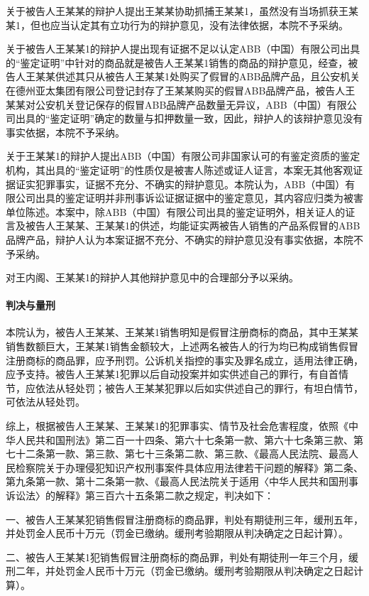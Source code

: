 \documentclass[
    a4paper
    ]{ctexart}
\begin{document}
{\begin{sloppy}
关于被告人王某某的辩护人提出王某某协助抓捕王某某1，虽然没有当场抓获王某某1，但也应当认定其有立功行为的辩护意见，没有法律依据，本院不予采纳。

关于被告人王某某1的辩护人提出现有证据不足以认定ABB（中国）有限公司出具的“鉴定证明”中针对的商品就是被告人王某某1销售的商品的辩护意见，经查，被告人王某某供述其只从被告人王某某1处购买了假冒的ABB品牌产品，且公安机关在德州亚太集团有限公司登记封存了王某某购买的假冒ABB品牌产品，被告人王某某对公安机关登记保存的假冒ABB品牌产品数量无异议，ABB（中国）有限公司出具的“鉴定证明”确定的数量与扣押数量一致，因此，辩护人的该辩护意见没有事实依据，本院不予采纳。

关于王某某1的辩护人提出ABB（中国）有限公司非国家认可的有鉴定资质的鉴定机构，其出具的“鉴定证明”的性质仅是被害人陈述或证人证言，本案无其他客观证据证实犯罪事实，证据不充分、不确实的辩护意见。本院认为，ABB（中国）有限公司出具的鉴定证明并非刑事诉讼证据证据中的鉴定意见，其内容应归类为被害单位陈述。本案中，除ABB（中国）有限公司出具的鉴定证明外，相关证人的证言及被告人王某某、王某某1的供述，均能证实两被告人销售的产品系假冒的ABB品牌产品，辩护人认为本案证据不充分、不确实的辩护意见没有事实依据，本院不予采纳。 

对王内阁、王某某1的辩护人其他辩护意见中的合理部分予以采纳。

\paragraph{判决与量刑}

本院认为，被告人王某某、王某某1销售明知是假冒注册商标的商品，其中王某某销售数额巨大，王某某1销售金额较大，上述两名被告人的行为均已构成销售假冒注册商标的商品罪，应予刑罚。公诉机关指控的事实及罪名成立，适用法律正确，应予支持。被告人王某某1犯罪以后自动投案并如实供述自己的罪行，有自首情节，应依法从轻处罚；被告人王某某犯罪以后如实供述自己的罪行，有坦白情节，可依法从轻处罚。

综上，根据被告人王某某、王某某1的犯罪事实、情节及社会危害程度，依照《中华人民共和国刑法》第二百一十四条、第六十七条第一款、第六十七条第三款、第七十二条第一款、第三款、第七十三条第二款、第三款、《最高人民法院、最高人民检察院关于办理侵犯知识产权刑事案件具体应用法律若干问题的解释》第二条、第九条第一款、第十二条第一款、《最高人民法院关于适用〈中华人民共和国刑事诉讼法〉的解释》第三百六十五条第二款之规定，判决如下：

一、被告人王某某犯销售假冒注册商标的商品罪，判处有期徒刑三年，缓刑五年，并处罚金人民币十万元（罚金已缴纳。缓刑考验期限从判决确定之日起计算）。

二、被告人王某某1犯销售假冒注册商标的商品罪，判处有期徒刑一年三个月，缓刑二年，并处罚金人民币十万元（罚金已缴纳。缓刑考验期限从判决确定之日起计算）。


\end{sloppy}}
\end{document}
